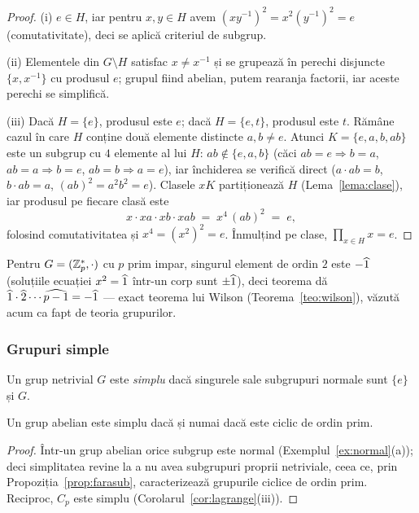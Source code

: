 \begin{proof}
(i) $e\in H$, iar pentru $x,y\in H$ avem $(xy^{-1})^2=x^2(y^{-1})^2=e$ (comutativitate), deci se aplică criteriul de subgrup.

(ii) Elementele din $G\setminus H$ satisfac $x\neq x^{-1}$ și se grupează în perechi disjuncte $\{x,x^{-1}\}$ cu produsul $e$; grupul fiind abelian, putem rearanja factorii, iar aceste perechi se simplifică.

(iii) Dacă $H=\{e\}$, produsul este $e$; dacă $H=\{e,t\}$, produsul este $t$. Rămâne cazul în care $H$ conține două elemente distincte $a,b\neq e$. Atunci $K=\{e,a,b,ab\}$ este un subgrup cu $4$ elemente al lui $H$: $ab\notin\{e,a,b\}$ (căci $ab=e\Rightarrow b=a$, $ab=a\Rightarrow b=e$, $ab=b\Rightarrow a=e$), iar închiderea se verifică direct ($a\cdot ab=b$, $b\cdot ab=a$, $(ab)^2=a^2b^2=e$). Clasele $xK$ partiționează $H$ (Lema~\ref{lema:clase}), iar produsul pe fiecare clasă este
\[
x\cdot xa\cdot xb\cdot xab \;=\; x^4\,(ab)^2 \;=\; e,
\]
folosind comutativitatea și $x^4=(x^2)^2=e$. Înmulțind pe clase, $\prod_{x\in H}x=e$.
\end{proof}

\begin{observatie}
Pentru $G=(\mathbb{Z}_p^*,\cdot)$ cu $p$ prim impar, singurul element de ordin $2$ este $-\widehat{1}$ (soluțiile ecuației $x^2=\widehat{1}$ într-un corp sunt $\pm\widehat{1}$), deci teorema dă $\widehat{1}\cdot\widehat{2}\cdots\widehat{p-1}=-\widehat{1}$ --- exact teorema lui Wilson (Teorema~\ref{teo:wilson}), văzută acum ca fapt de teoria grupurilor.
\end{observatie}

\subsubsection*{Grupuri simple}

\begin{definitie}
Un grup netrivial $G$ este \emph{simplu} dacă singurele sale subgrupuri normale sunt $\{e\}$ și $G$.
\end{definitie}

\begin{lema}\label{lema:abeliansimplu}
Un grup abelian este simplu dacă și numai dacă este ciclic de ordin prim.
\end{lema}

\begin{proof}
Într-un grup abelian orice subgrup este normal (Exemplul~\ref{ex:normal}(a)); deci simplitatea revine la a nu avea subgrupuri proprii netriviale, ceea ce, prin Propoziția~\ref{prop:farasub}, caracterizează grupurile ciclice de ordin prim. Reciproc, $C_p$ este simplu (Corolarul~\ref{cor:lagrange}(iii)).
\end{proof}

